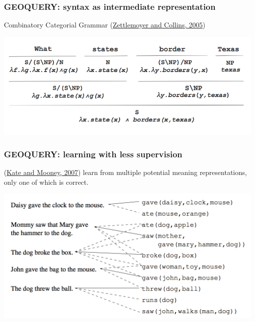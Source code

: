 \documentclass[ignorenonframetext]{beamer}
\begin{document}
\begin{frame}\frametitle{GEOQUERY: syntax as intermediate representation}
Combinatory Categorial Grammar
(\href{http://homes.cs.washington.edu/~lsz/papers/zc-uai05.pdf}{Zettlemoyer and Collins, 2005})
\begin{center}
\href{http://homes.cs.washington.edu/~lsz/papers/zc-uai05-slides.pdf}{
\includegraphics[width=\textwidth]{images/zettlemoyer-ccg.png}}
\end{center}
\end{frame}

\begin{frame}\frametitle{GEOQUERY: learning with less supervision}
(\href{http://www.cs.utexas.edu/~ai-lab/pub-view.php?PubID=126763}{Kate and Mooney, 2007}) learn from multiple potential meaning representations, only one of which is correct.
\begin{center}
\href{http://www.cs.utexas.edu/~ai-lab/pub-view.php?PubID=126763}{
\includegraphics[width=\textwidth]{images/kate-ambiguous.png}}
\end{center}
\end{frame}
\end{document}

